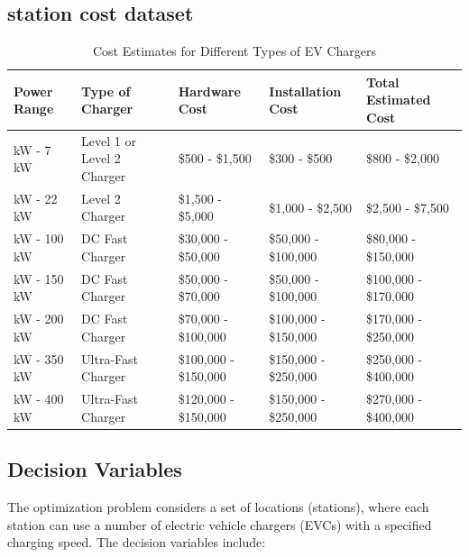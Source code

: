 \subsection{station cost dataset}
\begin{table}[h!]
    \centering
    \small %
    \begin{tabular}{|>{\raggedright\arraybackslash}p{2cm}|>{\raggedright\arraybackslash}p{3cm}|>{\raggedright\arraybackslash}p{2cm}|>{\raggedright\arraybackslash}p{2cm}|>{\raggedright\arraybackslash}p{3cm}|}
    \hline
    \textbf{Power Range} & \textbf{Type of Charger} & \textbf{Hardware Cost} & \textbf{Installation Cost} & \textbf{Total Estimated Cost} \\
    \hline
    3 kW - 7 kW & Level 1 or Level 2 Charger & \$500 - \$1,500 & \$300 - \$500 & \$800 - \$2,000 \\
    \hline
    7 kW - 22 kW & Level 2 Charger & \$1,500 - \$5,000 & \$1,000 - \$2,500 & \$2,500 - \$7,500 \\
    \hline
    50 kW - 100 kW & DC Fast Charger & \$30,000 - \$50,000 & \$50,000 - \$100,000 & \$80,000 - \$150,000 \\
    \hline
    100 kW - 150 kW & DC Fast Charger & \$50,000 - \$70,000 & \$50,000 - \$100,000 & \$100,000 - \$170,000 \\
    \hline
    150 kW - 200 kW & DC Fast Charger & \$70,000 - \$100,000 & \$100,000 - \$150,000 & \$170,000 - \$250,000 \\
    \hline
    200 kW - 350 kW & Ultra-Fast Charger & \$100,000 - \$150,000 & \$150,000 - \$250,000 & \$250,000 - \$400,000 \\
    \hline
    350 kW - 400 kW & Ultra-Fast Charger & \$120,000 - \$150,000 & \$150,000 - \$250,000 & \$270,000 - \$400,000 \\
    \hline
    \end{tabular}
    \caption{Cost Estimates for Different Types of EV Chargers}
    \end{table}




\subsection{Decision Variables}

The optimization problem considers a set of locations (stations), where each station can use a number of electric vehicle chargers (EVCs) with a specified charging speed. The decision variables include:

